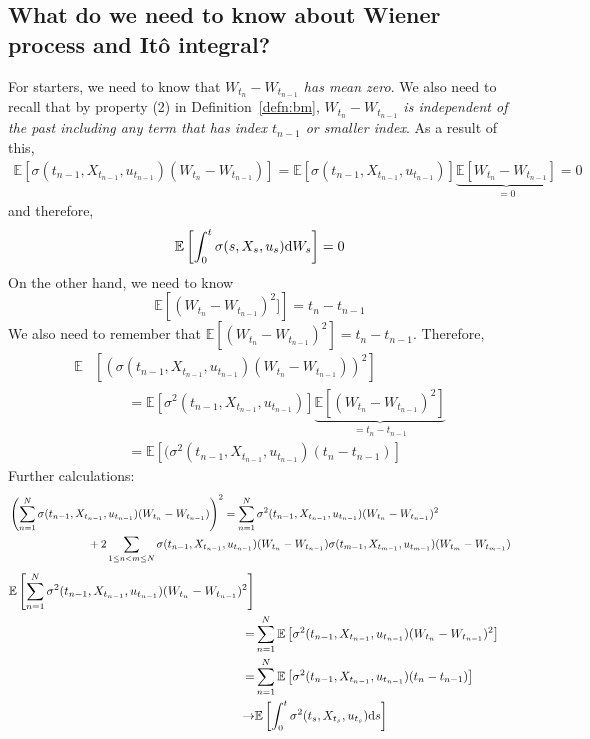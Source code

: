 \documentclass[11pt]{book}
\newcommand{\ds}{\text{\normalfont d}s}
\newcommand{\dW}{\text{\normalfont d}W}
\begin{document}
\subsection{What do we need to know about Wiener process and Itô integral?}
For starters, we need to know that \emph{$W_{t_{n}}-W_{t_{n-1}}$ has mean zero}. 
We also need to recall that by property (2) in Definition~\ref{defn:bm}, \emph{$W_{t_{n}}-W_{t_{n-1}}$ is independent of the past including any term that has index $t_{n-1}$ or smaller index}.
As a result of this, 
\[
\begin{split}
    \mathbb{E}\left[\sigma(t_{n-1},X_{t_{n-1}},u_{t_{n-1}})(W_{t_{n}}-W_{t_{n-1}})\right]=\mathbb{E}\left[\sigma(t_{n-1},X_{t_{n-1}},u_{t_{n-1}})\right]\underbrace{\mathbb{E}\left[W_{t_{n}}-W_{t_{n-1}}\right]}_{=0}=0
\end{split}
\]
and therefore, 
\[
\mathbb{E}\left[\int_0^t \sigma(s,X_s,u_s)\dW_s\right]=0
\]
On the other hand, we need to know 
\[
\mathbb{E}\left[(W_{t_{n}}-W_{t_{n-1}})^2]\right]=t_n-t_{n-1}
\]
We also need to remember that \emph{$\mathbb{E}\left[(W_{t_{n}}-W_{t_{n-1}})^2\right]=t_{n}-t_{n-1}$}.
Therefore, 
\[
\begin{split}
    \mathbb{E}&\left[\left(\sigma(t_{n-1},X_{t_{n-1}},u_{t_{n-1}})(W_{t_{n}}-W_{t_{n-1}})\right)^2\right]\\
    &\hspace{1cm}=\mathbb{E}\left[\sigma^2(t_{n-1},X_{t_{n-1}},u_{t_{n-1}})\right]\underbrace{\mathbb{E}\left[(W_{t_{n}}-W_{t_{n-1}})^2\right]}_{=t_{n}-t_{n-1}}\\
    &\hspace{1cm}=\mathbb{E}\left[(\sigma^2(t_{n-1},X_{t_{n-1}},u_{t_{n-1}})(t_{n}-t_{n-1})\right]
\end{split}
\]
Further calculations:
\[
\begin{split}
    &\left(\sum_{n=1}^{N} \sigma(t_{n-1},X_{t_{n-1}},u_{t_{n-1}})(W_{t_{n}}-W_{t_{n-1}})\right)^2=  \sum_{n=1}^{N} \sigma^2(t_{n-1},X_{t_{n-1}},u_{t_{n-1}})(W_{t_{n}}-W_{t_{n-1}})^2\\
    &\hspace{2.5cm}+2\sum_{1\le n<m\le N} \sigma(t_{n-1},X_{t_{n-1}},u_{t_{n-1}})(W_{t_{n}}-W_{t_{n-1}})\sigma(t_{m-1},X_{t_{m-1}},u_{t_{m-1}})(W_{t_{m}}-W_{t_{m-1}})
\end{split}
\]
\[
\begin{split}
    \mathbb{E}\left[\sum_{n=1}^{N} \sigma^2(t_{n-1},X_{t_{n-1}},u_{t_{n-1}})(W_{t_{n}}-W_{t_{n-1}})^2\right] 
    \\
    = &\sum_{n=1}^{N}\mathbb{E}\left[\sigma^2(t_{n-1},X_{t_{n-1}},u_{t_{n-1}})(W_{t_{n}}-W_{t_{n-1}})^2\right] \\
    = &\sum_{n=1}^{N}\mathbb{E}\left[\sigma^2(t_{n-1},X_{t_{n-1}},u_{t_{n-1}})({t_{n}}-{t_{n-1}})\right]
    \\
    \to &
    \mathbb{E} \left[\int_0^t\sigma^2(t_{s},X_{t_{s}},u_{t_{s}})\ds\right]
\end{split}
\]
\end{document}
